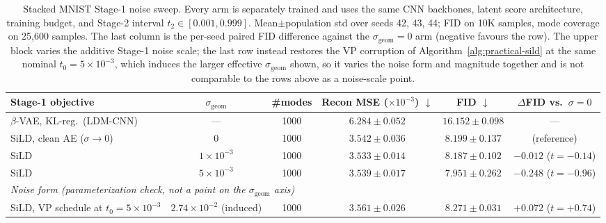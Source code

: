 \begin{table}[h]
\centering
\caption{%
Stacked MNIST Stage-1 noise sweep. Every arm is separately trained and uses
the same CNN backbones, latent score architecture, training budget, and
Stage-2 interval $t_2\in[0.001,0.999]$. Mean$\pm$population std over seeds
42, 43, 44; FID on 10K samples, mode coverage on 25{,}600 samples. The last
column is the per-seed paired FID difference against the
$\sigma_{\mathrm{geom}}=0$ arm (negative favours the row). The upper block
varies the additive Stage-1 noise scale; the last row instead restores the VP
corruption of Algorithm~\ref{alg:practical-sild} at the same nominal
$t_0=5\!\times\!10^{-3}$, which induces the larger effective
$\sigma_{\mathrm{geom}}$ shown, so it varies the noise form and magnitude
together and is not comparable to the rows above as a noise-scale point.%
}
\label{tab:stage1_noise_sweep}
\small
\begin{tabular}{lccccc}
\toprule
Stage-1 objective & $\sigma_{\mathrm{geom}}$ & \#modes & Recon MSE ($\times10^{-3}$) $\downarrow$ & FID $\downarrow$ & $\Delta$FID vs.\ $\sigma\!=\!0$ \\
\midrule
$\beta$-VAE, KL-reg.\ (LDM-CNN)      & ---                   & 1000 & $6.284 \pm 0.052$ & $16.152 \pm 0.098$ & --- \\
\midrule
SiLD, clean AE ($\sigma\!\to\!0$)    & $0$                   & 1000 & $3.542 \pm 0.036$ & $8.199 \pm 0.137$  & (reference) \\
SiLD                                 & $1\!\times\!10^{-3}$  & 1000 & $3.533 \pm 0.014$ & $8.187 \pm 0.102$  & $-0.012$ ($t=-0.14$) \\
SiLD                                 & $5\!\times\!10^{-3}$  & 1000 & $3.539 \pm 0.017$ & $7.951 \pm 0.262$  & $-0.248$ ($t=-0.96$) \\
\midrule
\multicolumn{6}{l}{\emph{Noise form (parameterization check, not a point on the $\sigma_{\mathrm{geom}}$ axis)}} \\
SiLD, VP schedule at $t_0\!=\!5\!\times\!10^{-3}$ & $2.74\!\times\!10^{-2}$ (induced) & 1000 & $3.561 \pm 0.026$ & $8.271 \pm 0.031$  & $+0.072$ ($t=+0.74$) \\
\bottomrule
\end{tabular}
\end{table}

